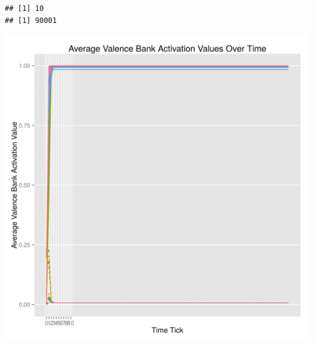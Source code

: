 \documentclass{article}\usepackage[]{graphicx}\usepackage[]{color}
\makeatletter
\def\maxwidth{ %
  \ifdim\Gin@nat@width>\linewidth
    \linewidth
  \else
    \Gin@nat@width
  \fi
}
\newenvironment{kframe}{%
 \def\at@end@of@kframe{}%
 \ifinner\ifhmode%
  \def\at@end@of@kframe{\end{minipage}}%
  \begin{minipage}{\columnwidth}%
 \fi\fi%
 \def\FrameCommand##1{\hskip\@totalleftmargin \hskip-\fboxsep
 \colorbox{shadecolor}{##1}\hskip-\fboxsep
     \hskip-\linewidth \hskip-\@totalleftmargin \hskip\columnwidth}%
 \MakeFramed {\advance\hsize-\width
   \@totalleftmargin\z@ \linewidth\hsize
   \@setminipage}}%
 {\par\unskip\endMakeFramed%
 \at@end@of@kframe}
\newenvironment{knitrout}{}{} %
\makeatother
\begin{document}
\begin{knitrout}
\begin{kframe}\begin{verbatim}
## [1] 10
## [1] 90001
\end{verbatim}
\end{kframe}
\includegraphics[width=\maxwidth]{figure/unnamed-chunk-210} 

\end{knitrout}
\end{document}

